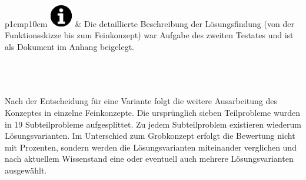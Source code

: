 \begin{tabular}{p{1cm}p{10cm}}
		{\includegraphics[width=1cm]{Enddokumentation/Varianten/Bilder/info_icon.png}}
	 & Die detaillierte Beschreibung der Lösungsfindung (von der Funktionsskizze bis zum Feinkonzept) war Aufgabe des zweiten Testates und ist als Dokument im Anhang beigelegt. \\
\end{tabular}\\
\\
\\
Nach der Entscheidung für eine Variante folgt die weitere Ausarbeitung des Konzeptes
in einzelne Feinkonzepte. Die ursprünglich sieben Teilprobleme wurden in 19 Subteilprobleme
aufgesplittet. Zu jedem Subteilproblem existieren wiederum Lösungsvarianten. Im Unterschied zum Grobkonzept erfolgt die Bewertung nicht mit Prozenten, sondern werden die Lösungsvarianten miteinander verglichen und nach aktuellem Wissenstand eine oder eventuell auch mehrere Lösungsvarianten ausgewählt. 



